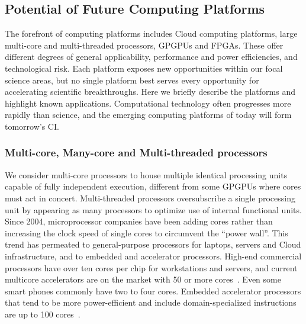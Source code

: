 \subsection{Potential of Future Computing Platforms}
The forefront of computing platforms includes Cloud computing platforms, large multi-core and
multi-threaded processors, GPGPUs and FPGAs. These offer different degrees of general applicability,
performance and power efficiencies, and technological risk. 
Each platform exposes new
opportunities within our focal science areas, but no single platform best serves every opportunity
for accelerating scientific breakthroughs. 
Here we briefly describe the platforms and highlight
known applications. Computational technology often progresses more rapidly than science, and the
emerging computing platforms of today will form tomorrow's CI.

\subsubsection{Multi-core, Many-core and Multi-threaded processors}
We consider multi-core processors to house multiple identical processing units capable of fully
independent execution, different from some GPGPUs where cores must act in concert. 
Multi-threaded processors oversubscribe a single processing unit by appearing as many processors to optimize
use of internal functional units. 
Since 2004, microprocessor companies have been adding
cores rather than increasing the clock speed of single cores to circumvent the ``power wall''.
This
trend has permeated to general-purpose processors for laptops, servers and Cloud infrastructure, and
to embedded and accelerator processors. 
High-end commercial processors have over ten cores per chip for workstations and servers\cite{power8,sparcm6,intel-ivytown}, and current multicore accelerators
are on the market with 50 or more cores~\cite{intel.mic}.
Even some smart phones commonly have two to four cores.
Embedded accelerator processors that tend to
be more power-efficient and include domain-specialized instructions are up to 100 cores~\cite{Bell2008, TileGX8100}.


